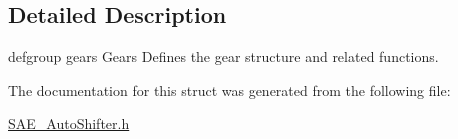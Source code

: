 \subsection{Detailed Description}
defgroup gears Gears Defines the gear structure and related functions. 

The documentation for this struct was generated from the following file\-:\begin{DoxyCompactItemize}
\item 
\hyperlink{_s_a_e___auto_shifter_8h}{S\-A\-E\-\_\-\-Auto\-Shifter.\-h}\end{DoxyCompactItemize}
